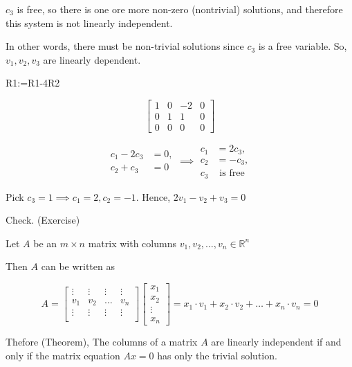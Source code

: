 \documentclass[12pt]{article}
\begin{document}
$c_3$ is free, so there is one ore more non-zero (nontrivial) solutions, and therefore
this system is not linearly independent.

In other words, there must be non-trivial solutions since $c_3$ is a free
variable. So, $v_1, v_2, v_3$ are linearly dependent.

R1:=R1-4R2

\begin{equation*}
  \begin{bmatrix}
    1 & 0 & -2 & 0 \\
    0 & 1 & 1 & 0 \\
    0 & 0 & 0 & 0
  \end{bmatrix}
\end{equation*}

\[
\begin{aligned}
c_1 - 2c_3 &= 0, \\
c_2 + c_3 &= 0
\end{aligned}
\implies
\begin{aligned}
c_1 &= 2c_3, \\
c_2 &= -c_3, \\
c_3 &\text{ is free}
\end{aligned}
\]

Pick $c_3 = 1 \implies c_1 = 2, c_2 = -1$. Hence, $2v_1 - v_2 + v_3 = 0$

Check. (Exercise)

Let $A$ be an $m \times n$ matrix with columns 
$v_{1}, v_{2}, \dots, v_{n} \in \mathbb{R}^{n}$

Then $A$ can be written as

\begin{equation*}
  A = \begin{bmatrix}
    \vdots & \vdots & \vdots & \vdots \\
    v_{1} & v_{2} & \dots & v_{n} \\
    \vdots & \vdots & \vdots & \vdots \\
  \end{bmatrix}
  \begin{bmatrix}
    x_1 \\ x_2 \\ \vdots \\ x_n
    \end{bmatrix}
   = 
   x_1 \cdot v_1 + x_2 \cdot v_2 + \dots + x_n \cdot v_n = 0
\end{equation*}

Thefore (Theorem), The columns of a matrix $A$ are linearly independent 
if and only if the matrix equation $Ax=0$ has only the trivial solution.
\end{document}
